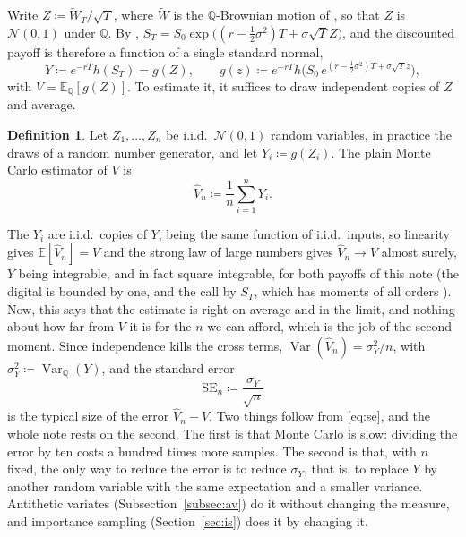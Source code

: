 \documentclass[11pt,a4paper]{article}
\theoremstyle{plain}
\theoremstyle{definition}
\newtheorem{definition}[theorem]{Definition}
\theoremstyle{remark}
\newcommand{\E}{\mathbb{E}}
\newcommand{\Q}{\mathbb{Q}}
\newcommand{\1}{\mathbf{1}}
\newcommand{\eqdef}{\coloneqq}
\newcommand{\Var}{\operatorname{Var}}
\newcommand{\Wt}{\widetilde{W}}
\begin{document}
Write $Z \eqdef \Wt_T/\sqrt T$, where $\Wt$ is the $\Q$-Brownian motion of \cite[(5.13)]{tfg}, so that $Z$ is $\mathcal N(0,1)$ under $\Q$. By \cite[(5.26)]{tfg}, $S_T = S_0 \exp\bigl((r - \tfrac12\sigma^2)T + \sigma\sqrt T Z\bigr)$, and the discounted payoff is therefore a function of a single standard normal,
\begin{equation}\label{eq:g}
  Y \eqdef e^{-rT}h(S_T) = g(Z),
  \qquad
  g(z) \eqdef e^{-rT}h\bigl(S_0\, e^{(r - \frac12\sigma^2)T + \sigma\sqrt T z}\bigr),
\end{equation}
with $V = \E_\Q[g(Z)]$. To estimate it, it suffices to draw independent copies of $Z$ and average.

\begin{definition}\label{def:mc}
Let $Z_1, \dots, Z_n$ be i.i.d.\ $\mathcal N(0,1)$ random variables, in practice the draws of a random number generator, and let $Y_i \eqdef g(Z_i)$. The plain Monte Carlo estimator of $V$ is
\begin{equation}\label{eq:mc}
  \hat V_n \eqdef \frac1n \sum_{i=1}^n Y_i .
\end{equation}
\end{definition}

The $Y_i$ are i.i.d.\ copies of $Y$, being the same function of i.i.d.\ inputs, so linearity gives $\E[\hat V_n] = V$ and the strong law of large numbers gives $\hat V_n \to V$ almost surely, $Y$ being integrable, and in fact square integrable, for both payoffs of this note (the digital is bounded by one, and the call by $S_T$, which has moments of all orders \cite[\S 5.3]{tfg}). Now, this says that the estimate is right on average and in the limit, and nothing about how far from $V$ it is for the $n$ we can afford, which is the job of the second moment. Since independence kills the cross terms, $\Var(\hat V_n) = \sigma_Y^2/n$, with $\sigma_Y^2 \eqdef \Var_\Q(Y)$, and the standard error
\begin{equation}\label{eq:se}
  \mathrm{SE}_n \eqdef \frac{\sigma_Y}{\sqrt n}
\end{equation}
is the typical size of the error $\hat V_n - V$. Two things follow from \eqref{eq:se}, and the whole note rests on the second. The first is that Monte Carlo is slow: dividing the error by ten costs a hundred times more samples. The second is that, with $n$ fixed, the only way to reduce the error is to reduce $\sigma_Y$, that is, to replace $Y$ by another random variable with the same expectation and a smaller variance. Antithetic variates (Subsection~\ref{subsec:av}) do it without changing the measure, and importance sampling (Section~\ref{sec:is}) does it by changing it.
\end{document}
